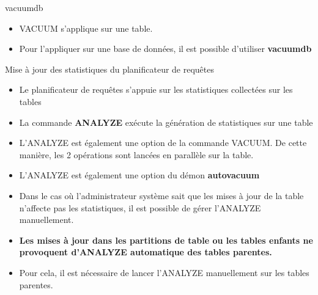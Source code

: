 
\begin{frame}{vacuumdb}

   \begin{itemize}
      \item VACUUM s'applique sur une table.
      \item Pour l'appliquer sur une base de données, il est possible d'utiliser \textbf{vacuumdb}
   \end{itemize}

\begin{toile}
\end{toile}

\end{frame}


\begin{frame}{Mise à jour des statistiques du planificateur de requêtes}

   \begin{itemize}
      \item Le planificateur de requêtes s'appuie sur les statistiques collectées sur les tables
      \item La commande \textbf{ANALYZE} exécute la génération de statistiques sur une table
      \item L'ANALYZE est également une option de la commande VACUUM. De cette manière, les 2 opérations sont lancées en parallèle sur la table.
      \item L'ANALYZE est également une option du démon \textbf{autovacuum}
      \item Dans le cas où l'administrateur système sait que les mises à jour de la table n'affecte pas les statistiques, il est possible de gérer l'ANALYZE manuellement.
      \item \textbf{Les mises à jour dans les partitions de table ou les tables enfants ne provoquent d'ANALYZE automatique des tables parentes.}
      \item Pour cela, il est nécessaire de lancer l'ANALYZE manuellement sur les tables parentes.
   \end{itemize}

\begin{toile}
\end{toile}

\end{frame}


